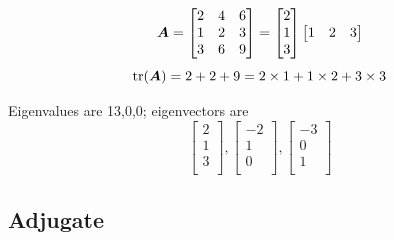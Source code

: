 \documentclass{overview}
\begin{document}
\begin{example}
\[
	\boldsymbol{A}=
\begin{bmatrix}
	2 & 4 & 6 \\
	1 & 2 & 3 \\
	3 & 6 & 9 \\
\end{bmatrix}
=
\begin{bmatrix} 2\\ 1\\ 3\\ \end{bmatrix}
\begin{bmatrix} 1 & 2 & 3 \\ \end{bmatrix}
\] 
\[ \operatorname{tr}(\boldsymbol{A}) = 2+2+9 = 2\times 1 + 1\times 2 + 3\times 3 \] 

Eigenvalues are 13,0,0; eigenvectors are
\[
\begin{bmatrix} 2\\ 1\\ 3\\ \end{bmatrix},
\begin{bmatrix} -2\\ 1\\ 0\\ \end{bmatrix},
\begin{bmatrix} -3\\ 0\\ 1\\ \end{bmatrix}
\]
\end{example}


\subsection{Adjugate}
\end{document}
